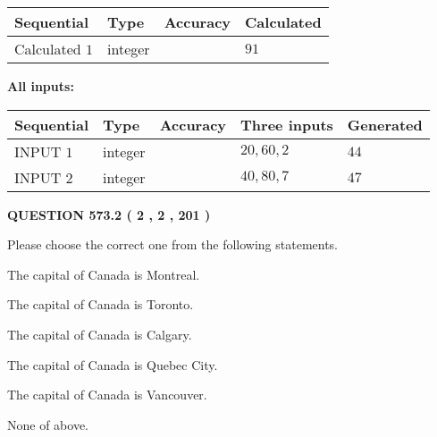\documentclass[12pt]{article}
\begin{document}
   
   
   
\noindent{}
   
   
  
  
\noindent\begin{tabular}{|l|l|l|l|}
\hline
 Sequential & Type & Accuracy & Calculated \\ 
\hline
 
 
  Calculated $  1 $ & integer &  & 
  $ 91 $ 
 \\  \hline  
 \end{tabular}
   
   
   
   
\noindent\vspace{0.1in}\hspace{-0.08in} {\textbf{\Large{All inputs: }}}
   
   
  
  
\noindent\begin{tabular}{|l|l|l|l|l|}
\hline
 Sequential & Type & Accuracy & Three inputs & Generated \\ 
\hline
 
 
  INPUT $  1 $ & integer &  & $
 20
 , 
 60
 , 
 2
 $ & $ 44 $ 
 \\  \hline  
 
 
  INPUT $  2 $ & integer &  & $
 40
 , 
 80
 , 
 7
 $ & $ 47 $ 
 \\  \hline  
 \end{tabular}
   
   
  
\vspace{0.2in}
  
{\textbf{\Large{QUESTION
573.2 
 ( 2 , 2 , 201 )
}}}
  
  
Please choose the correct one from the following statements.
 
 
The capital of Canada is Montreal.
 
 
The capital of Canada is Toronto.
 
 
The capital of Canada is Calgary.
 
 
The capital of Canada is Quebec City.
 
 
The capital of Canada is Vancouver.
 
 
 None of above.
 
 
\noindent{}
 
\end{document}
